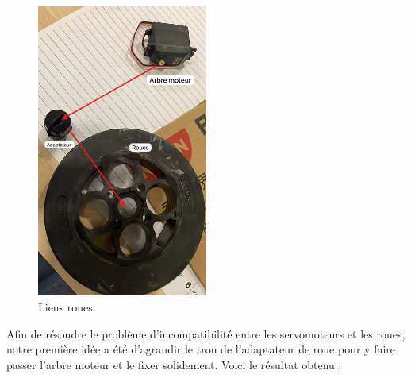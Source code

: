 \documentclass[a4paper,12pt]{report}  %
\begin{document}
\begin{figure}[H]
	\centering
	\includegraphics[width=0.5\textwidth]{./attachments/liens_roues.png}
	\caption{Liens roues.}
\end{figure}

Afin de résoudre le problème d’incompatibilité entre les servomoteurs et les roues, notre première idée a été d’agrandir le trou de l’adaptateur de roue pour y faire passer l’arbre moteur et le fixer solidement. Voici le résultat obtenu :
\end{document}
